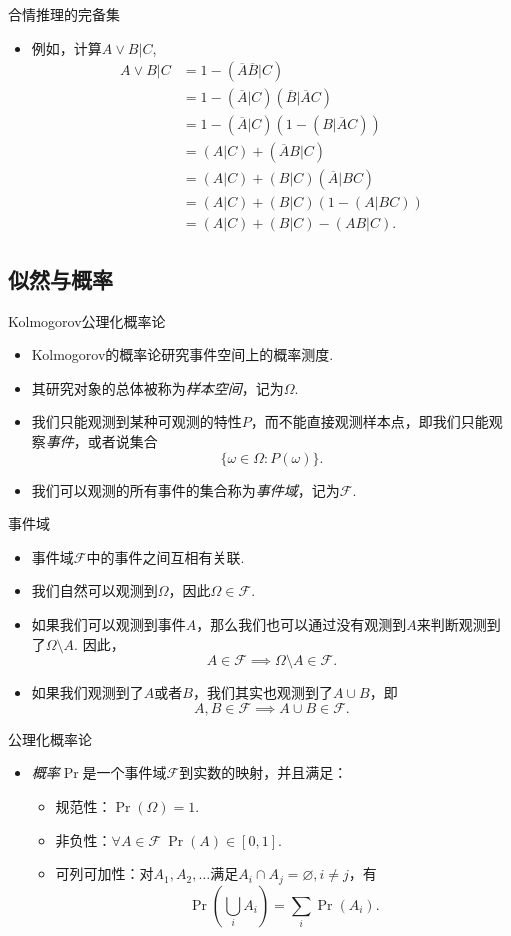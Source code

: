{合情推理的完备集}
\begin{itemize}
    \item 例如，计算$A\vee B|C$,
    \begin{align*}
        A \vee B|C 
        &= 1 - (\overline{A}\overline{B}|C)\\
        & = 1 - (\overline{A}|C)(\overline{B}|\overline{A}C) \\
        &= 1 - (\overline{A}|C)(1 - (B|\overline{A}C))\\
        &= (A|C) + (\overline{A}B|C) \\
        &= (A|C) + (B|C)(\overline{A}|BC) \\
        &= (A|C) + (B|C)(1 - (A|BC)) \\
        &= (A|C) + (B|C) - (AB|C).
    \end{align*}
\end{itemize}


\subsection{似然与概率}
{Kolmogorov公理化概率论}
\begin{itemize}
    \item Kolmogorov的概率论研究事件空间上的概率测度.
    \item 其研究对象的总体被称为\emph{样本空间}，记为$\Omega$.
    \item 我们只能观测到某种可观测的特性$P$，而不能直接观测样本点，即我们只能观察\emph{事件}，或者说集合
    \[\{\omega\in \Omega:P(\omega)\}.\]
    \item 我们可以观测的所有事件的集合称为\emph{事件域}，记为$\mathscr{F}$.
\end{itemize}


{事件域}
\begin{itemize}
    \item 事件域$\mathscr{F}$中的事件之间互相有关联.
    \item 我们自然可以观测到$\Omega$，因此$\Omega\in\mathscr{F}$.
    \item 如果我们可以观测到事件$A$，那么我们也可以通过没有观测到$A$来判断观测到了$\Omega\setminus A$. 因此，
    \[A\in\mathscr{F}\implies \Omega\setminus A\in\mathscr{F}.\]
    \item 如果我们观测到了$A$或者$B$，我们其实也观测到了$A\cup B$，即
    \[A,B\in\mathscr{F}\implies A\cup B\in\mathscr{F}.\]
\end{itemize}


{公理化概率论}
\begin{itemize}
    \item \emph{概率}$\Pr$是一个事件域$\mathscr{F}$到实数的映射，并且满足：
    \begin{itemize}
        \item 规范性：$\Pr(\Omega)=1$.
        \item 非负性：$\forall A\in\mathscr{F}~\Pr(A)\in[0,1]$.
        \item 可列可加性：对$A_1,A_2,\dots$满足$A_i\cap A_j=\varnothing,i\neq j$，有
        \[\Pr\left(\bigcup_i A_i\right)=\sum_i \Pr(A_i).\]
    \end{itemize}
\end{itemize}


